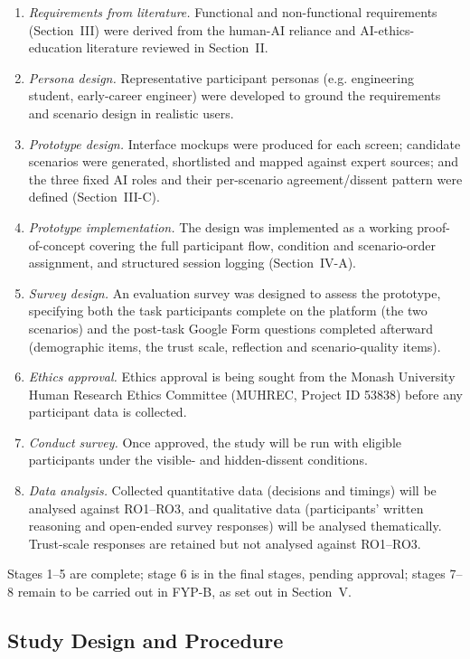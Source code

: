 \documentclass[conference]{IEEEtran}
\begin{document}
\begin{enumerate}
    \item \textit{Requirements from literature.} Functional and non-functional requirements (Section~III) were derived from the human-AI reliance and AI-ethics-education literature reviewed in Section~II.
    \item \textit{Persona design.} Representative participant personas (e.g. engineering student, early-career engineer) were developed to ground the requirements and scenario design in realistic users.
    \item \textit{Prototype design.} Interface mockups were produced for each screen; candidate scenarios were generated, shortlisted and mapped against expert sources; and the three fixed AI roles and their per-scenario agreement/dissent pattern were defined (Section~III-C).
    \item \textit{Prototype implementation.} The design was implemented as a working proof-of-concept covering the full participant flow, condition and scenario-order assignment, and structured session logging (Section~IV-A).
    \item \textit{Survey design.} An evaluation survey was designed to assess the prototype, specifying both the task participants complete on the platform (the two scenarios) and the post-task Google Form questions completed afterward (demographic items, the trust scale, reflection and scenario-quality items).
    \item \textit{Ethics approval.} Ethics approval is being sought from the Monash University Human Research Ethics Committee (MUHREC, Project ID 53838) before any participant data is collected.
    \item \textit{Conduct survey.} Once approved, the study will be run with eligible participants under the visible- and hidden-dissent conditions.
    \item \textit{Data analysis.} Collected quantitative data (decisions and timings) will be analysed against RO1--RO3, and qualitative data (participants' written reasoning and open-ended survey responses) will be analysed thematically. Trust-scale responses are retained but not analysed against RO1--RO3.
\end{enumerate}

Stages 1--5 are complete; stage 6 is in the final stages, pending approval; stages 7--8 remain to be carried out in FYP-B, as set out in Section~V.

\subsection{Study Design and Procedure}
\end{document}
